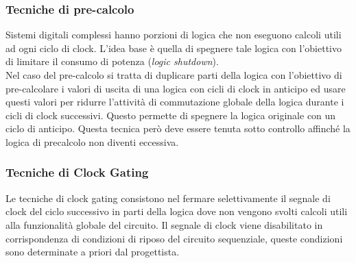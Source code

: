 \subsubsection{Tecniche di pre-calcolo}
Sistemi digitali complessi hanno porzioni di logica che non eseguono calcoli utili  ad ogni ciclo di clock. L'idea base è quella di spegnere tale logica con l'obiettivo di limitare il consumo di potenza (\emph{logic shutdown}).\\
Nel caso del pre-calcolo si tratta di duplicare parti della logica con l'obiettivo di pre-calcolare i valori di uscita di una logica con cicli di clock in anticipo ed usare questi valori per ridurre l'attività di commutazione globale della logica durante i cicli di clock successivi.
Questo permette di spegnere la logica originale con un ciclo di anticipo. Questa tecnica però deve essere tenuta sotto controllo affinché la logica di precalcolo non diventi eccessiva.
\subsubsection{Tecniche di Clock Gating}
Le tecniche di clock gating consistono nel fermare selettivamente il segnale di clock del ciclo successivo in parti della logica dove non vengono svolti calcoli utili alla funzionalità globale del circuito.
Il segnale di clock viene disabilitato in corrispondenza di condizioni di riposo del circuito sequenziale, queste condizioni sono determinate a priori dal progettista.